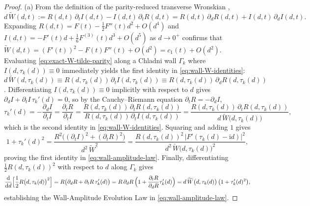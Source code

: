 \documentclass[11pt,reqno]{amsart}
\theoremstyle{definition}
\theoremstyle{remark}
\numberwithin{equation}{section}
\newcommand{\dd}{\mathrm{d}}
\newcommand{\ii}{\mathrm{i}}
\begin{document}
\begin{proof}
(a) From the definition of the parity-reduced transverse Wronskian \cite{Missiaen2026P8,Missiaen2026P13},
\begin{equation}\label{eq:exact-W-tilde-parity}
d\,\widetilde{W}(d,t) := R(d,t)\,\partial_t I(d,t) - I(d,t)\,\partial_t R(d,t) = R(d,t)\,\partial_d R(d,t) + I(d,t)\,\partial_d I(d,t).
\end{equation}
Expanding $R(d,t) = F(t) - \frac{1}{2}F''(t)d^2 + O(d^4)$ and $I(d,t) = -F'(t)d + \frac{1}{6}F^{(3)}(t)d^3 + O(d^5)$ as $d \to 0^+$ confirms that $\widetilde{W}(d,t) = (F'(t))^2 - F(t)F''(t) + O(d^2) = c_1(t) + O(d^2)$. Evaluating \eqref{eq:exact-W-tilde-parity} along a Chladni wall $\Gamma_k$ where $I(d,\tau_k(d)) \equiv 0$ immediately yields the first identity in \eqref{eq:wall-W-identities}: $d\,\widetilde{W}(d,\tau_k(d)) \equiv R(d,\tau_k(d))\,\partial_t I(d,\tau_k(d)) \equiv R(d,\tau_k(d))\,\partial_d R(d,\tau_k(d))$. Differentiating $I(d,\tau_k(d)) \equiv 0$ implicitly with respect to $d$ gives $\partial_d I + \partial_t I\,\tau_k'(d) = 0$, so by the Cauchy--Riemann equation $\partial_t R = -\partial_d I$,
\[
\tau_k'(d) = -\frac{\partial_d I}{\partial_t I} = \frac{\partial_t R}{\partial_t I} = \frac{R(d,\tau_k(d))\,\partial_t R(d,\tau_k(d))}{R(d,\tau_k(d))\,\partial_t I(d,\tau_k(d))} = \frac{R(d,\tau_k(d))\,\partial_t R(d,\tau_k(d))}{d\,\widetilde{W}\bigl(d,\tau_k(d)\bigr)},
\]
which is the second identity in \eqref{eq:wall-W-identities}. Squaring and adding $1$ gives
\[
1 + \tau_k'(d)^2 = \frac{R^2\bigl((\partial_t I)^2 + (\partial_t R)^2\bigr)}{d^2\,\widetilde{W}^2} = \frac{R(d,\tau_k(d))^2\,\bigl|F'(\tau_k(d)-\ii d)\bigr|^2}{d^2\,\widetilde{W}\bigl(d,\tau_k(d)\bigr)^2},
\]
proving the first identity in \eqref{eq:wall-amplitude-law}. Finally, differentiating $\frac{1}{2}R(d,\tau_k(d))^2$ with respect to $d$ along $\Gamma_k$ gives
\[
\frac{\dd}{\dd d}\Bigl[\frac{1}{2}R\bigl(d,\tau_k(d)\bigr)^2\Bigr] = R\bigl(\partial_d R + \partial_t R\,\tau_k'(d)\bigr) = R\,\partial_d R\,\Bigl(1 + \frac{\partial_t R}{\partial_d R}\tau_k'(d)\Bigr) = d\,\widetilde{W}\bigl(d,\tau_k(d)\bigr)\,\bigl(1 + \tau_k'(d)^2\bigr),
\]
establishing the Wall-Amplitude Evolution Law in \eqref{eq:wall-amplitude-law}.


\end{proof}
\end{document}
